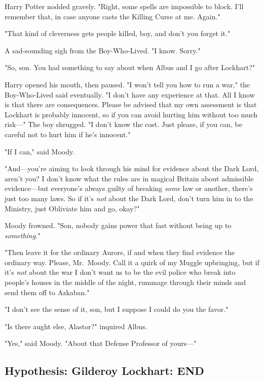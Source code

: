 Harry Potter nodded gravely. "Right, some spells are impossible to block. I'll
remember that, in case anyone casts the Killing Curse at me. Again."

"That kind of cleverness gets people killed, boy, and don't you forget it."

A sad-sounding sigh from the Boy-Who-Lived. "I know. Sorry."

"So, son. You had something to say about when Albus and I go after Lockhart?"

Harry opened his mouth, then paused. "I won't tell you how to run a war," the
Boy-Who-Lived said eventually. "I don't have any experience at that. All I know
is that there are consequences. Please be advised that my own assessment is
that Lockhart is probably innocent, so if you can avoid hurting him without too
much risk—" The boy shrugged. "I don't know the cost. Just please, if you
can, be careful not to hurt him if he's innocent."

"If I can," said Moody.

"And—you're aiming to look through his mind for evidence about the Dark Lord,
aren't you? I don't know what the rules are in magical Britain about admissible
evidence—but everyone's always guilty of breaking \emph{some} law or another,
there's just too many laws. So if it's \emph{not} about the Dark Lord, don't
turn him in to the Ministry, just Obliviate him and go, okay?"

Moody frowned. "Son, nobody gains power that fast without being up to
\emph{something.}"

"Then leave it for the ordinary Aurors, if and when they find evidence the
ordinary way. Please, Mr.~Moody. Call it a quirk of my Muggle upbringing, but
if it's \emph{not} about the war I don't want us to be the evil police who
break into people's houses in the middle of the night, rummage through their
minds and send them off to Azkaban."

"I don't see the sense of it, son, but I suppose I could do you the favor."

"Is there aught else, Alastor?" inquired Albus.

"Yes," said Moody. "About that Defense Professor of yours—"
\sbreak
\vspace{-2\baselineskip}
\subsection{Hypothesis: Gilderoy Lockhart: END}
\sbreak
\vspace{-2\baselineskip}
